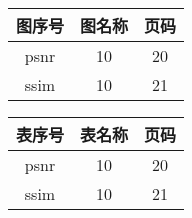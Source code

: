 
\newpage\thispagestyle{empty}
\begin{center}\setcounter{page}{1}\end{center}
\begin{center}{\bfseries\xiaoer{}}\end{center}
 {\wuhao
   \begin{raggedright}
    \begin{tabular}{|c| c| c|}
	     	\hline
	       \hspace{4em}图序号 \hspace{4em} & \hspace{7em}图名称 \hspace{7em} &\hspace{4em} 页码 \hspace{4em} \\
	      \hline
	       psnr  &  10     &  20   \\
	       \hline
	       ssim  &  10     &   21    \\
	       \hline   	
     \end{tabular}
 \end{raggedright} 
 }   
 \clearpage
 


\newpage\thispagestyle{plain}
\begin{center}{\bfseries\xiaoer{}}\end{center}
 {\wuhao
   \begin{raggedright}
    \begin{tabular}{|c| c| c|}
	     	\hline
	       \hspace{4em}表序号 \hspace{4em} & \hspace{7em}表名称 \hspace{7em} &\hspace{4em} 页码 \hspace{4em} \\
	      \hline
	       psnr  &  10     &  20   \\
	       \hline
	       ssim  &  10     &   21    \\
	       \hline   	
     \end{tabular}
 \end{raggedright} 
 }   

